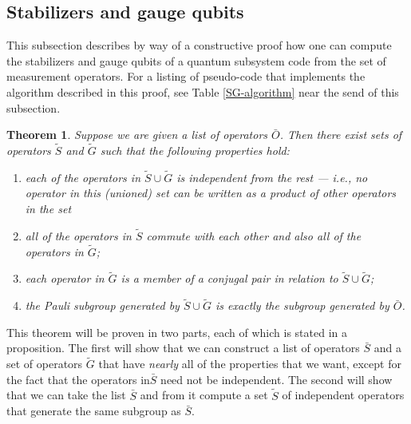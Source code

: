 \documentclass[twocolumn,showpacs,preprintnumbers,amsmath,amssymb,nofootinbib,pra,floatfix]{revtex4}
\newtheorem{theorem}{Theorem}
\newenvironment{remark}[1][Remark]{\begin{trivlist}
\item[\hskip \labelsep {\bfseries #1}]}{\end{trivlist}}
\newcommand{\lst}{\bar}
\newcommand{\set}{\tilde}
\begin{document}
\subsection{Stabilizers and gauge qubits}

\label{stabilizers-and-gauge-qubits}

\begin{remark}
This subsection describes by way of a constructive proof how one can
compute the stabilizers and gauge qubits of a quantum subsystem code
from the set of measurement operators.  For a listing of pseudo-code that
implements the algorithm described in this proof, see Table
\ref{SG-algorithm} near the send of this subsection.
\end{remark}
\begin{theorem} \label{theorem-SG} Suppose we are given a list of operators $\lst O$.  Then there exist sets of operators $\set S$ and $\set G$ such that the following properties hold:
\begin{enumerate}
\item each of the operators in $\set S \cup \set G$ is
  independent from the rest --- i.e., no operator in this (unioned) set can
  be written as a product of other operators in the set
\item \label{theorem-all-commute-SG-prop} all of the operators in $\set S$ commute with each other and
  also all of the operators in $\set G$;
\item \label{theorem-conjugal-pairs-SG-prop} each operator in $\set G$ is a member of a conjugal pair in relation to $\set S \cup \set G$;
\item \label{theorem-complete-SG-prop} the Pauli subgroup generated by $\set S \cup \set G$ is exactly
  the subgroup generated by $\lst O$.
\end{enumerate}
\end{theorem}
\begin{remark}
This theorem will be proven in two parts, each of which is stated in a proposition.  The first will show that we can construct a list of operators $\lst S$ and a set of operators $\set G$ that have \emph{nearly} all of the properties that we want, except for the fact that the operators in$\lst S$ need not be independent.  The second will show that we can take the list $\lst S$ and from it compute a set $\set S$ of independent operators that generate the same subgroup as $\lst S$.
\end{remark}
\end{document}
